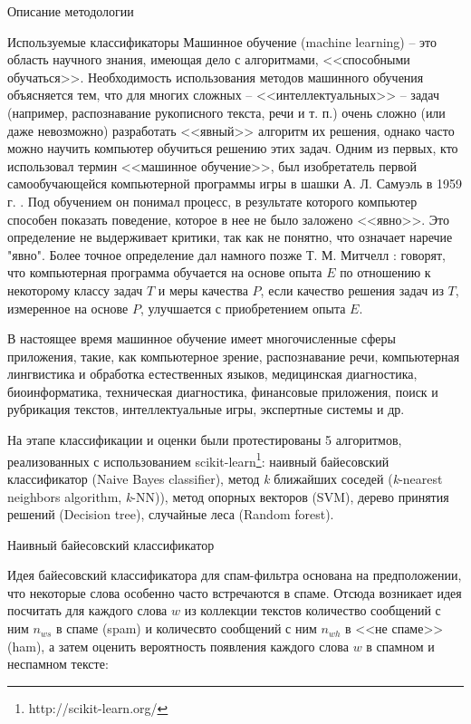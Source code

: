 \begin{section}{Описание методологии}
\begin{subsection}{Используемые классификаторы}
    Машинное обучение (machine learning) – это область научного знания, имеющая дело с алгоритмами, <<способными обучаться>>. Необходимость использования методов машинного обучения объясняется тем, что для многих сложных – <<интеллектуальных>> – задач (например, распознавание рукописного текста, речи и т. п.) очень сложно (или даже невозможно) разработать <<явный>> алгоритм их решения, однако часто можно научить компьютер обучиться решению этих задач. Одним из первых, кто использовал термин <<машинное обучение>>, был изобретатель первой самообучающейся компьютерной программы игры в шашки А. Л. Самуэль в 1959 г. \cite{Samuel}. Под обучением он понимал процесс, в результате которого компьютер способен показать поведение, которое в нее не было заложено <<явно>>. Это определение не выдерживает критики, так как не понятно, что означает наречие "явно". Более точное определение дал намного позже Т. М. Митчелл \cite{Mitchell}: говорят, что компьютерная программа обучается на основе опыта $E$ по отношению к некоторому классу задач $T$ и меры качества $P$, если качество решения задач из $T$, измеренное на основе $P$, улучшается с приобретением опыта $E$.

    В настоящее время машинное обучение имеет многочисленные сферы приложения, такие, как компьютерное зрение, распознавание речи, компьютерная лингвистика и обработка естественных языков, медицинская диагностика, биоинформатика, техническая диагностика, финансовые приложения, поиск и рубрикация текстов, интеллектуальные игры, экспертные системы и др.


    На этапе классификации и оценки были протестированы 5 алгоритмов, реализованных с использованием scikit-learn\footnote{http://scikit-learn.org/}: наивный байесовский классификатор (Naive Bayes classifier),
    метод \textit{k} ближайших соседей (\textit{k}-nearest neighbors algorithm, \textit{k}-NN)), метод опорных векторов (SVM), дерево принятия решений (Decision tree), случайные леса (Random forest).

    \begin{subsubsection}{Наивный байесовский классификатор}

Идея байесовский классификатора для спам-фильтра основана на предположении,
что некоторые слова особенно часто встречаются в спаме. Отсюда возникает идея посчитать для каждого слова $w$ из коллекции текстов количество сообщений с ним $n_{ws}$
в спаме (spam) и количесвто сообщений с ним $n_{wh}$ в <<не спаме>> (ham), а затем оценить вероятность появления каждого слова $w$ в спамном и неспамном тексте:


\end{subsubsection}
\end{subsection}
\end{section}
